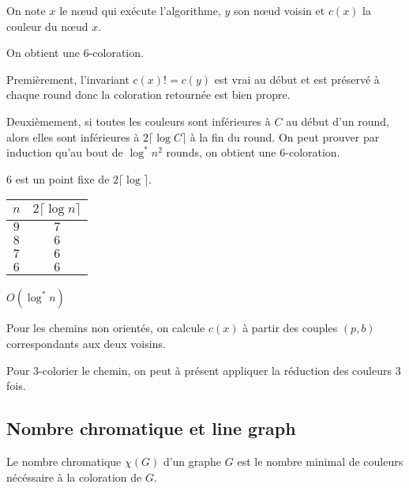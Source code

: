 On note $x$ le nœud qui exécute l'algorithme, $y$ son nœud voisin et $c(x)$ la couleur du nœud $x$.

On obtient une $6$-coloration.

\begin{correction}
	Premièrement, l'invariant \og $c(x) != c(y)$ \fg est vrai au début et est préservé à chaque round donc la coloration retournée est bien propre.
	
	Deuxièmement, si toutes les couleurs sont inférieures à $C$ au début d'un round, alors elles sont inférieures à $2 \lceil \log C \rceil$ à la fin du round. On peut prouver par induction qu'au bout de $\log^* n^2$ rounds, on obtient une $6$-coloration.
\end{correction}

\begin{note}
	$6$ est un point fixe de $2 \lceil \log \rceil$.
	
	\bigskip
	\begin{center}
		\begin{tabular}{ |c|c| } 
			\hline $n$ & $2 \lceil \log n \rceil$ \\ 
			\hline $9$ & $7$ \\ 
			\hline $8$ & $6$ \\
			\hline $7$ & $6$ \\
			\hline $6$ & $6$ \\
			\hline
		\end{tabular}
	\end{center}
\end{note}

\begin{complexite}
	$O(\log^* n)$
\end{complexite}

\begin{note}
	Pour les chemins non orientés, on calcule $c(x)$ à partir des couples $(p, b)$ correspondants aux deux voisins.
\end{note}

Pour $3$-colorier le chemin, on peut à présent appliquer la réduction des couleurs 3 fois.

\subsection{Nombre chromatique et line graph}

\begin{definition}
	Le nombre chromatique $\chi(G)$ d'un graphe $G$ est le nombre minimal de couleurs nécéssaire à la coloration de $G$.
\end{definition}

